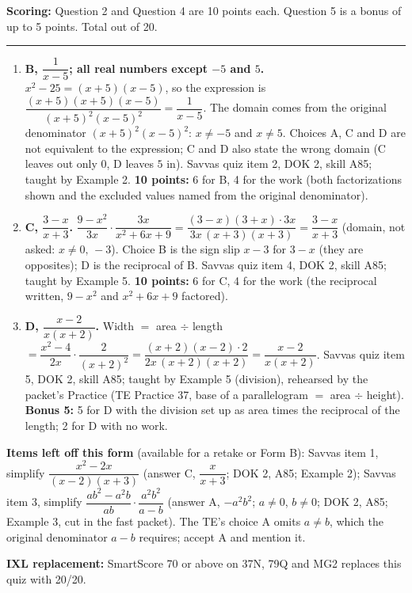 \documentclass[11pt]{article}
\begin{document}
\vfill
\noindent\textbf{Scoring:} Question 2 and Question 4 are 10 points each. Question 5 is a bonus of up to 5 points. Total out of 20.

\newpage
{}

\vspace{4pt}\noindent\rule{\textwidth}{0.6pt}

\begin{enumerate}
\item[\textbf{2.}] \textbf{B, $\dfrac{1}{x-5}$; all real numbers except $-5$ and $5$.} $x^2-25=(x+5)(x-5)$, so the expression is $\dfrac{(x+5)(x+5)(x-5)}{(x+5)^2(x-5)^2}=\dfrac{1}{x-5}$. The domain comes from the original denominator $(x+5)^2(x-5)^2$: $x\neq-5$ and $x\neq5$. Choices A, C and D are not equivalent to the expression; C and D also state the wrong domain (C leaves out only $0$, D leaves $5$ in). Savvas quiz item 2, DOK 2, skill A85; taught by Example 2. \textbf{10 points:} 6 for B, 4 for the work (both factorizations shown and the excluded values named from the original denominator).
\item[\textbf{4.}] \textbf{C, $\dfrac{3-x}{x+3}$.} $\dfrac{9-x^2}{3x}\cdot\dfrac{3x}{x^2+6x+9}=\dfrac{(3-x)(3+x)\cdot 3x}{3x\,(x+3)(x+3)}=\dfrac{3-x}{x+3}$ (domain, not asked: $x\neq0,\,-3$). Choice B is the sign slip $x-3$ for $3-x$ (they are opposites); D is the reciprocal of B. Savvas quiz item 4, DOK 2, skill A85; taught by Example 5. \textbf{10 points:} 6 for C, 4 for the work (the reciprocal written, $9-x^2$ and $x^2+6x+9$ factored).
\item[\textbf{5.}] \textbf{D, $\dfrac{x-2}{x(x+2)}$.} Width $=$ area $\div$ length $=\dfrac{x^2-4}{2x}\cdot\dfrac{2}{(x+2)^2}=\dfrac{(x+2)(x-2)\cdot2}{2x\,(x+2)(x+2)}=\dfrac{x-2}{x(x+2)}$. Savvas quiz item 5, DOK 2, skill A85; taught by Example 5 (division), rehearsed by the packet's Practice (TE Practice 37, base of a parallelogram $=$ area $\div$ height). \textbf{Bonus 5:} 5 for D with the division set up as area times the reciprocal of the length; 2 for D with no work.
\end{enumerate}

\textbf{Items left off this form} (available for a retake or Form B): Savvas item 1, simplify $\dfrac{x^2-2x}{(x-2)(x+3)}$ (answer C, $\dfrac{x}{x+3}$; DOK 2, A85; Example 2); Savvas item 3, simplify $\dfrac{ab^2-a^2b}{ab}\cdot\dfrac{a^2b^2}{a-b}$ (answer A, $-a^2b^2$; $a\neq0$, $b\neq0$; DOK 2, A85; Example 3, cut in the fast packet). The TE's choice A omits $a\neq b$, which the original denominator $a-b$ requires; accept A and mention it.

\textbf{IXL replacement:} SmartScore 70 or above on 37N, 79Q and MG2 replaces this quiz with 20/20.
\end{document}
